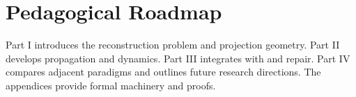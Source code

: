 \chapter*{Pedagogical Roadmap}

Part I introduces the reconstruction problem and projection geometry. Part II develops propagation and dynamics. Part III integrates \CLIO with \RSVP and repair. Part IV compares adjacent paradigms and outlines future research directions. The appendices provide formal machinery and proofs.



